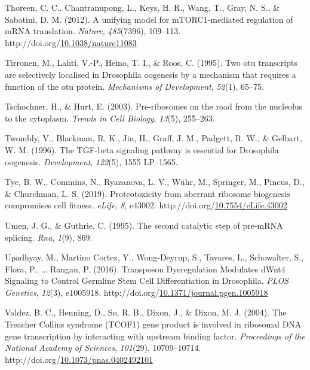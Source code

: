\documentclass[12pt,oneside]{reedthesis}
\newlength{\cslhangindent}
\newenvironment{CSLReferences}[2] %
 {%
  \setlength{\parindent}{0pt}
  \ifodd #1 \everypar{\setlength{\hangindent}{\cslhangindent}}\ignorespaces\fi
  \ifnum #2 > 0
  \setlength{\parskip}{#2\baselineskip}
  \fi
 }%
 {}
\begin{document}
\begin{CSLReferences}{1}{0}
\leavevmode{}%
Thoreen, C. C., Chantranupong, L., Keys, H. R., Wang, T., Gray, N. S., \& Sabatini, D. M. (2012). A unifying model for {mTORC1}-mediated regulation of {mRNA} translation. \emph{Nature}, \emph{485}(7396), 109--113. http://doi.org/\href{https://doi.org/10.1038/nature11083}{10.1038/nature11083}

\leavevmode{}%
Tirronen, M., Lahti, V.-P., Heino, T. I., \& Roos, C. (1995). Two otu transcripts are selectively localised in {Drosophila} oogenesis by a mechanism that requires a function of the otu protein. \emph{Mechanisms of Development}, \emph{52}(1), 65--75.

\leavevmode{}%
Tschochner, H., \& Hurt, E. (2003). Pre-ribosomes on the road from the nucleolus to the cytoplasm. \emph{Trends in Cell Biology}, \emph{13}(5), 255--263.

\leavevmode{}%
Twombly, V., Blackman, R. K., Jin, H., Graff, J. M., Padgett, R. W., \& Gelbart, W. M. (1996). The {TGF}-beta signaling pathway is essential for {Drosophila} oogenesis. \emph{Development}, \emph{122}(5), 1555 LP--1565.

\leavevmode{}%
Tye, B. W., Commins, N., Ryazanova, L. V., Wühr, M., Springer, M., Pincus, D., \& Churchman, L. S. (2019). Proteotoxicity from aberrant ribosome biogenesis compromises cell fitness. \emph{eLife}, \emph{8}, e43002. http://doi.org/\href{https://doi.org/10.7554/eLife.43002}{10.7554/eLife.43002}

\leavevmode{}%
Umen, J. G., \& Guthrie, C. (1995). The second catalytic step of pre-{mRNA} splicing. \emph{Rna}, \emph{1}(9), 869.

\leavevmode{}%
Upadhyay, M., Martino Cortez, Y., Wong-Deyrup, S., Tavares, L., Schowalter, S., Flora, P., \ldots{} Rangan, P. (2016). Transposon {Dysregulation Modulates dWnt4 Signaling} to {Control Germline Stem Cell Differentiation} in {Drosophila}. \emph{PLOS Genetics}, \emph{12}(3), e1005918. http://doi.org/\href{https://doi.org/10.1371/journal.pgen.1005918}{10.1371/journal.pgen.1005918}

\leavevmode{}%
Valdez, B. C., Henning, D., So, R. B., Dixon, J., \& Dixon, M. J. (2004). The {Treacher Collins} syndrome ({TCOF1}) gene product is involved in ribosomal {DNA} gene transcription by interacting with upstream binding factor. \emph{Proceedings of the National Academy of Sciences}, \emph{101}(29), 10709--10714. http://doi.org/\href{https://doi.org/10.1073/pnas.0402492101}{10.1073/pnas.0402492101}


\end{CSLReferences}
\end{document}
